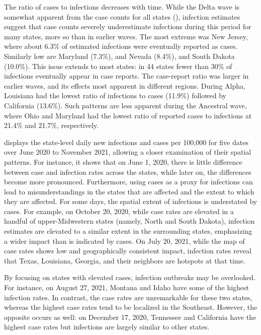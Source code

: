 The ratio of cases to infections decreases with time. While the Delta wave is
somewhat apparent from the case counts for all states
(), infection estimates suggest that case counts
severely underestimate infections during this period for many states, more so
than in earlier waves. The most extreme was New Jersey, where about 6.3\% of
estimated infections were eventually reported as cases. Similarly low are
Maryland (7.3\%), and Nevada (8.4\%), and South Dakota (10.0\%). This issue
extends to most states: in 44 states fewer than 30\% of infections eventually
appear in case reports. The case-report ratio was larger in earlier waves, and
its effects most apparent in different regions. During Alpha, Louisiana had the
lowest ratio of infections to cases (11.9\%) followed by California (13.6\%).
Such patterns are less apparent during the Ancestral wave, where Ohio and
Maryland had the lowest ratio of reported cases to infections at 21.4\% and
21.7\%, respectively. 

 displays the state-level daily new infections
and cases per 100,000 for five dates over June 2020 to November 2021, allowing a
closer examination of their spatial patterns. For instance, it shows
that on June 1, 2020, there is little difference between case and infection
rates across the states, while later on, the differences become more pronounced.
Furthermore, using cases as a proxy for infections can lead to
misunderstandings in the states that are affected and the extent to which they
are affected. For some days, the spatial extent of infections is understated by
cases. For example, on October 20, 2020, while case rates are elevated in a
handful of upper-Midwestern states (namely, North and South Dakota), infection
estimates are elevated to a similar extent in the surrounding states,
emphasizing a wider impact than is indicated by cases. On July 20, 2021, while
the map of case rates shows low and geographically consistent impact, infection
rates reveal that Texas, Louisiana, Georgia, and their neighbors are hotspots at
that time. 

By focusing on states with elevated cases, infection outbreaks may be
overlooked. For instance, on August 27, 2021, Montana and Idaho have some of the
highest infection rates. In contrast, the case rates are unremarkable for these
two states, whereas the highest case rates tend to be localized in the Southeast. However, the opposite occurs as well: on December
17, 2020, Tennessee and California have the highest case rates but infections
are largely similar to other states.

